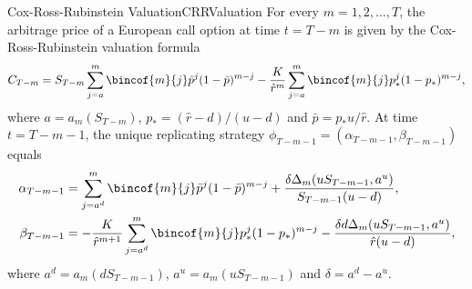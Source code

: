 \begin{prop}{Cox-Ross-Rubinstein Valuation}{CRRValuation}
	For every \(m = 1, 2, \dots, T\), the arbitrage price of a European call option at time \(t = T - m\) is given by the Cox-Ross-Rubinstein valuation formula
	\begin{equation} \label{eq:CRRValuationFormula}
		C_{T-m} = S_{T-m} \sum_{j=a}^m \bincof{m}{j} \bar{p}^j (1 - \bar{p})^{m-j} - \frac{K}{\hat{r}^m} \sum_{j=a}^m \bincof{m}{j} p_*^j (1 - p_*)^{m-j},
	\end{equation}
	where \(a = a_m(S_{T-m})\), \(p_* = (\hat{r} - d)/(u-d)\) and \(\bar{p} = p_* u / \hat{r}\). At time \(t = T - m - 1\), the unique replicating strategy \(\phi_{T-m-1} = (\alpha_{T-m-1}, \beta_{T-m-1})\) equals
	\begin{align*}
		\alpha_{T-m-1} & = \sum_{j=a^d}^m \bincof{m}{j} \bar{p}^j (1 - \bar{p})^{m-j} + \frac{\delta \Delta_m(u S_{T-m-1}, a^u)}{S_{T-m-1}(u-d)},                   \\
		\beta_{T-m-1}  & = - \frac{K}{\hat{r}^{m+1}} \sum_{j=a^d}^m \bincof{m}{j} p_*^j (1 - p_*)^{m-j} - \frac{\delta d \Delta_m(u S_{T-m-1}, a^u)}{\hat{r}(u-d)},
	\end{align*}
	where \(a^d = a_m(d S_{T-m-1})\), \(a^u = a_m(u S_{T-m-1})\) and \(\delta = a^d - a^u\).
\end{prop}
